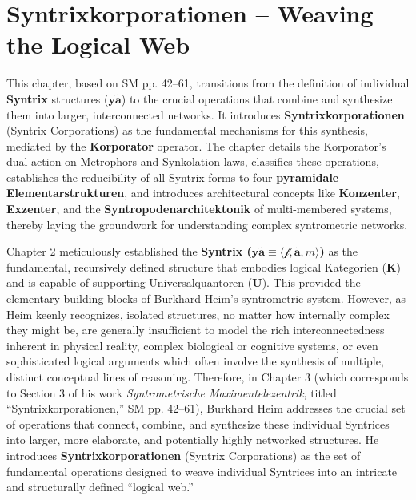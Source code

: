 \documentclass[12pt]{article}
\newcommand{\q}[1]{\enquote{#1}}
\newcommand{\kategorie}{\bm{K}}
\newcommand{\syntrix}{\bm{y\widetilde{a}}}
\newcommand{\metrophor}{\bm{\widetilde{a}}}
\newcommand{\synkolator}{\mathcal{f}}
\newcommand{\synkolationsstufe}{m}
\newcommand{\universalquantor}{\bm{U}}
\begin{document}
\section{Syntrixkorporationen – Weaving the Logical Web}
\label{sec:chapter3}

This chapter, based on SM pp. 42–61, transitions from the definition of individual \textbf{Syntrix} structures (\(\syntrix\)) to the crucial operations that combine and synthesize them into larger, interconnected networks. It introduces \textbf{Syntrixkorporationen} (Syntrix Corporations) as the fundamental mechanisms for this synthesis, mediated by the \textbf{Korporator} operator. The chapter details the Korporator's dual action on Metrophors and Synkolation laws, classifies these operations, establishes the reducibility of all Syntrix forms to four \textbf{pyramidale Elementarstrukturen}, and introduces architectural concepts like \textbf{Konzenter}, \textbf{Exzenter}, and the \textbf{Syntropodenarchitektonik} of multi-membered systems, thereby laying the groundwork for understanding complex syntrometric networks.

Chapter 2 meticulously established the \textbf{Syntrix (\( \syntrix \equiv \langle \synkolator, \metrophor, \synkolationsstufe \rangle \))} as the fundamental, recursively defined structure that embodies logical Kategorien (\(\kategorie\)) and is capable of supporting Universalquantoren (\(\universalquantor\)). This provided the elementary building blocks of Burkhard Heim's syntrometric system. However, as Heim keenly recognizes, isolated structures, no matter how internally complex they might be, are generally insufficient to model the rich interconnectedness inherent in physical reality, complex biological or cognitive systems, or even sophisticated logical arguments which often involve the synthesis of multiple, distinct conceptual lines of reasoning. Therefore, in Chapter 3 (which corresponds to Section 3 of his work \textit{Syntrometrische Maximentelezentrik}, titled \q{Syntrixkorporationen,} SM pp. 42–61), Burkhard Heim addresses the crucial set of operations that connect, combine, and synthesize these individual Syntrices into larger, more elaborate, and potentially highly networked structures. He introduces \textbf{Syntrixkorporationen} (Syntrix Corporations) as the set of fundamental operations designed to weave individual Syntrices into an intricate and structurally defined \q{logical web.}
\end{document}
